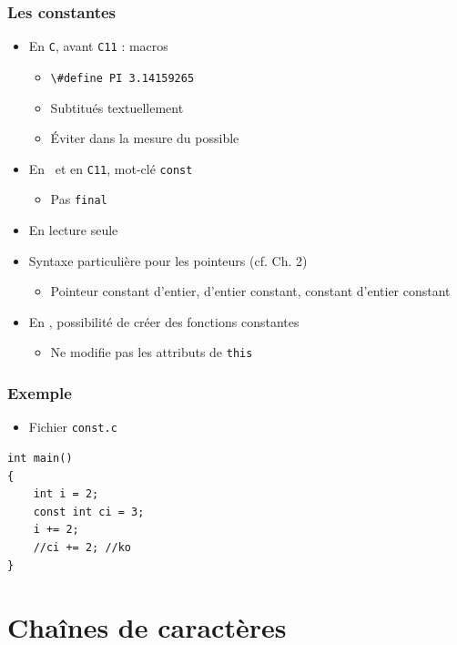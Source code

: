 \begin{frame}
\frametitle{Les constantes}
\begin{itemize}[<+->]
\item En \texttt{C}, avant \texttt{C11} : macros
	\begin{itemize}
	\item \lstinline|\#define PI 3.14159265|
	\item Subtitués textuellement
	\item Éviter dans la mesure du possible
	\end{itemize}
\item En \cpp\ et en \texttt{C11}, mot-clé \lstinline|const|
	\begin{itemize}
	\item Pas \lstinline|final|
	\end{itemize}
\item En lecture seule
\item Syntaxe particulière pour les pointeurs (cf. Ch. 2)
	\begin{itemize}
	\item Pointeur constant d'entier, d'entier constant, constant d'entier constant
	\end{itemize}
\item En \cpp, possibilité de créer des fonctions constantes
	\begin{itemize}
	\item Ne modifie pas les attributs de \lstinline|this|
	\end{itemize}
\end{itemize}
\end{frame}

\begin{frame}[containsverbatim]
\frametitle{Exemple}
\begin{itemize}
\item Fichier \texttt{const.c}
\end{itemize}
\begin{lstlisting}
int main()
{
	int i = 2;
	const int ci = 3;
	i += 2;
	//ci += 2; //ko
}
\end{lstlisting}
\end{frame}

\section{Chaînes de caractères}

